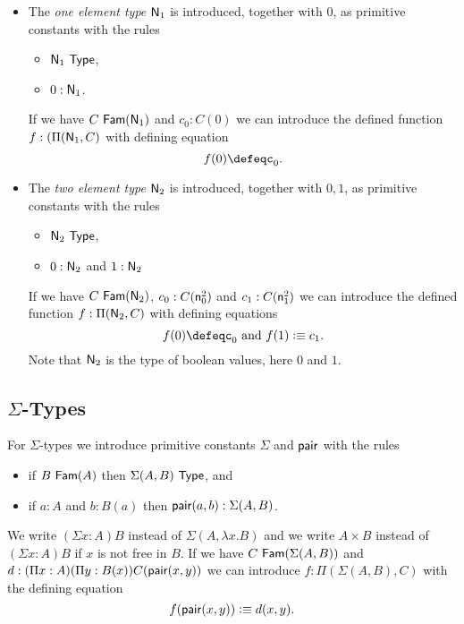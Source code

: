 {{\begin{itemize}
 If we have $C~\Fam(\NN_0)$ we can introduce $f:\Pi(\NN_0,C)$.  Note that in this case there is no defining equation.
In the special case where $C$ is $\lambda x.C_0$ where $C_0$ does not contain $x$ free, this represents the usual law of absurd elimination $\NN_0\rightarrow C_0$.

\medskip

\item The {\em one element type} ${\sf N}_1$ is introduced, together with $0$, as primitive constants with the rules
\begin{itemize}
\item ${\sf N}_1~{\sf Type}$,
\item $0:{\sf N}_1$.
\end{itemize}
If we have $C~{\sf Fam}({\sf N}_1)$ and $c_0:C(0)$ we can introduce the defined function 
$f:(\Pi({\sf N}_1,C)$ with defining equation
  \[ f(0)\defeqc_0.\]
\item The {\em two element type} ${\sf N}_2$ is introduced, together with $0,1$, as primitive constants with the rules
\begin{itemize}
\item ${\sf N}_2~{\sf Type}$,
\item $0:{\sf N}_2$ and $1:{\sf N}_2$
\end{itemize}
If we have $C~{\sf Fam}({\sf N}_2)$, $c_0:C({\sf n}^2_0)$ and $c_1:C({\sf n}^2_1)$ we can introduce the defined function 
$f:\Pi({\sf N}_2,C)$ with defining equations
  \[ f(0)\defeqc_0\mbox{ and }f(1)\defeq c_1.\]
Note that ${\sf N}_2$ is the type of boolean values, here $0$ and $1$.
\end{itemize}
}%

\subsection*{$\Sigma$-Types}
For $\Sigma$-types we introduce primitive constants $\Sigma$ and ${\sf pair}$ with the rules
\begin{itemize}
\item if $B~{\sf Fam}(A)$ then $\Sigma(A,B)~{\sf Type}$, and
\item if $a:A$ and $b:B(a)$ then ${\sf pair}(a,b):\Sigma(A,B)$.
\end{itemize}
We write $(\Sigma x:A)B$ instead
of $\Sigma(A,\lambda x.B)$ and we write $A\times B$ instead of $(\Sigma x:A)B$ if
$x$ is not free in $B$.  If we have $C~{\sf Fam}(\Sigma(A,B))$ and
$
d:(\Pi x:A)(\Pi y:B(x))C({\sf pair}(x,y))
$
we can introduce $f:\Pi(\Sigma(A,B),C)$ with the defining equation
$$
f({\sf pair}(x,y))\vcentcolon\equiv d(x,y).
$$

}
